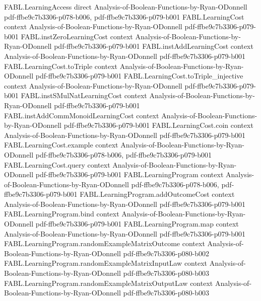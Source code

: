 \begin{theorem}
\proofstep
  {FABL.LearningAccess}
  {direct}
  {Analysis-of-Boolean-Functions-by-Ryan-ODonnell}
  {pdf-ffbe9c7b3306-p078-b006,
    pdf-ffbe9c7b3306-p079-b001}
\proofstep
  {FABL.LearningCost}
  {context}
  {Analysis-of-Boolean-Functions-by-Ryan-ODonnell}
  {pdf-ffbe9c7b3306-p079-b001}
\proofstep
  {FABL.instZeroLearningCost}
  {context}
  {Analysis-of-Boolean-Functions-by-Ryan-ODonnell}
  {pdf-ffbe9c7b3306-p079-b001}
\proofstep
  {FABL.instAddLearningCost}
  {context}
  {Analysis-of-Boolean-Functions-by-Ryan-ODonnell}
  {pdf-ffbe9c7b3306-p079-b001}
\proofstep
  {FABL.LearningCost.toTriple}
  {context}
  {Analysis-of-Boolean-Functions-by-Ryan-ODonnell}
  {pdf-ffbe9c7b3306-p079-b001}
\proofstep
  {FABL.LearningCost.toTriple_injective}
  {context}
  {Analysis-of-Boolean-Functions-by-Ryan-ODonnell}
  {pdf-ffbe9c7b3306-p079-b001}
\proofstep
  {FABL.instSMulNatLearningCost}
  {context}
  {Analysis-of-Boolean-Functions-by-Ryan-ODonnell}
  {pdf-ffbe9c7b3306-p079-b001}
\proofstep
  {FABL.instAddCommMonoidLearningCost}
  {context}
  {Analysis-of-Boolean-Functions-by-Ryan-ODonnell}
  {pdf-ffbe9c7b3306-p079-b001}
\proofstep
  {FABL.LearningCost.coin}
  {context}
  {Analysis-of-Boolean-Functions-by-Ryan-ODonnell}
  {pdf-ffbe9c7b3306-p079-b001}
\proofstep
  {FABL.LearningCost.example}
  {context}
  {Analysis-of-Boolean-Functions-by-Ryan-ODonnell}
  {pdf-ffbe9c7b3306-p078-b006,
    pdf-ffbe9c7b3306-p079-b001}
\proofstep
  {FABL.LearningCost.query}
  {context}
  {Analysis-of-Boolean-Functions-by-Ryan-ODonnell}
  {pdf-ffbe9c7b3306-p079-b001}
\proofstep
  {FABL.LearningProgram}
  {context}
  {Analysis-of-Boolean-Functions-by-Ryan-ODonnell}
  {pdf-ffbe9c7b3306-p078-b006,
    pdf-ffbe9c7b3306-p079-b001}
\proofstep
  {FABL.LearningProgram.addOutcomeCost}
  {context}
  {Analysis-of-Boolean-Functions-by-Ryan-ODonnell}
  {pdf-ffbe9c7b3306-p079-b001}
\proofstep
  {FABL.LearningProgram.bind}
  {context}
  {Analysis-of-Boolean-Functions-by-Ryan-ODonnell}
  {pdf-ffbe9c7b3306-p079-b001}
\proofstep
  {FABL.LearningProgram.map}
  {context}
  {Analysis-of-Boolean-Functions-by-Ryan-ODonnell}
  {pdf-ffbe9c7b3306-p079-b001}
\proofstep
  {FABL.LearningProgram.randomExampleMatrixOutcome}
  {context}
  {Analysis-of-Boolean-Functions-by-Ryan-ODonnell}
  {pdf-ffbe9c7b3306-p080-b002}
\proofstep
  {FABL.LearningProgram.randomExampleMatrixInputLaw}
  {context}
  {Analysis-of-Boolean-Functions-by-Ryan-ODonnell}
  {pdf-ffbe9c7b3306-p080-b003}
\proofstep
  {FABL.LearningProgram.randomExampleMatrixOutputLaw}
  {context}
  {Analysis-of-Boolean-Functions-by-Ryan-ODonnell}
  {pdf-ffbe9c7b3306-p080-b003}

\end{theorem}
